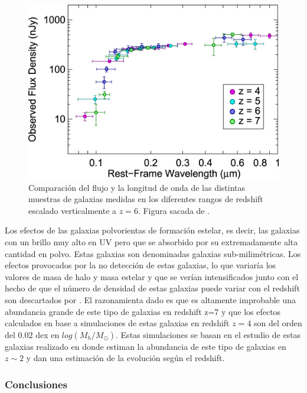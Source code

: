 \documentclass{article}
\begin{document}
\begin{figure}[t]
\begin{center}
\includegraphics[scale=1]{Figuras/sed_finkelstein}
\caption{\label{fig:sed_finkelstein} Comparación del flujo y la longitud de onda de las distintas muestras de galaxias medidas en los diferentes rangos de redshift escalado verticalmente a $z=6$. Figura sacada de \cite{finkelstein2015increasing}.}
\end{center}
\end{figure}

Los efectos de las galaxias polvorientas de formación estelar, es decir, las galaxias con un brillo muy alto en UV pero que se absorbido por su extremadamente alta cantidad en polvo. Estas galaxias son denominadas galaxias sub-milimétricas. Los efectos provocados por la no detección de estas galaxias, lo que variaría los valores de masa de halo y masa estelar y que se verían intensificados junto con el hecho de que el número de densidad de estas galaxias puede variar con el redshift son descartados por \cite{finkelstein2015increasing}. El razonamienta dado es que es altamente improbable una abundancia grande de este tipo de galaxias en redshift z=7 y que los efectos calculados en base a simulaciones de estas galaxias en redshift $z=4$ son del orden del $0.02$ dex en $log(M_h/M_\odot)$. Estas simulaciones se basan en el estudio de estas galaxias realizado en \cite{casey2014dusty} donde estiman la abundancia de este tipo de galaxias en $z\sim 2$ y dan una estimación de la evolución según el redshift.\\

\subsubsection*{Conclusiones}


\newpage





\end{document}
